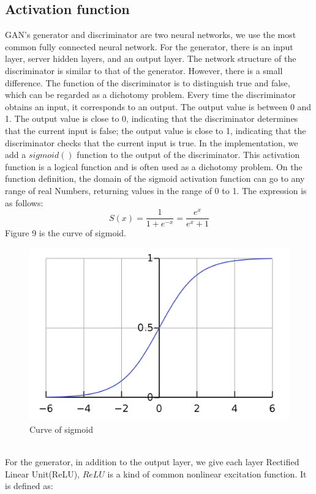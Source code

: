 \documentclass[11pt,a4paper]{article}
\begin{document}
\subsection{Activation function}
GAN’s generator and discriminator are two neural networks, we use the most common fully connected neural network. For the generator, there is an input layer, server hidden layers, and an output layer. The network structure of the discriminator is similar to that of the generator. However, there is a small difference. The function of the discriminator is to distinguish true and false, which can be regarded as a dichotomy problem. Every time the discriminator obtains an input, it corresponds to an output. The output value is between 0 and 1. The output value is close to 0, indicating that the discriminator determines that the current input is false; the output value is close to 1, indicating that the discriminator checks that the current input is true. In the implementation, we add a $sigmoid ()$ function to the output of the discriminator. This activation function is a logical function and is often used as a dichotomy problem. On the function definition, the domain of the sigmoid activation function can go to any range of real Numbers, returning values in the range of 0 to 1. The expression is as follows:
$$
S(x)=\frac{1}{1+e^{-x}}=\frac{e^{x}}{e^{x}+1}
$$
Figure 9 is the curve of sigmoid.
\begin{figure}[ht!]
\centering
\includegraphics[scale=0.15]{9.png}
\caption{Curve of sigmoid}
\label{fig:Curve of sigmoid}
\end{figure}
\\
\newline
For the generator, in addition to the output layer, we give each layer Rectified Linear Unit(ReLU), $ReLU$ is a kind of common nonlinear excitation function. It is defined as:
\end{document}
